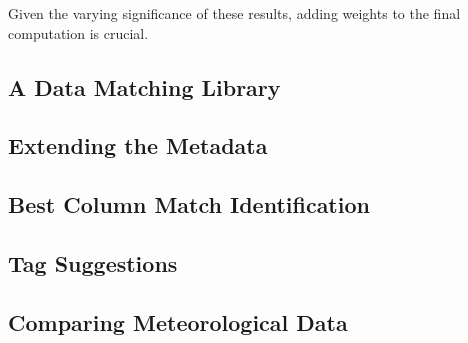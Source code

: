 Given the varying significance of these results, adding weights to the final computation is crucial.

\subsection{A Data Matching Library}

\subsection{Extending the Metadata}

\subsection{Best Column Match Identification}

\subsection{Tag Suggestions}

\subsection{Comparing Meteorological Data}
